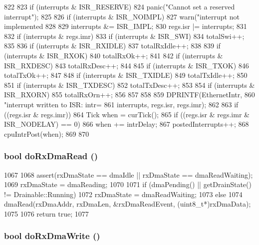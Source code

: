 \begin{DoxyCode}
822 {
823     if (interrupts & ISR_RESERVE)
824         panic("Cannot set a reserved interrupt");
825 
826     if (interrupts & ISR_NOIMPL)
827         warn("interrupt not implemented %
828 
829     interrupts &= ISR_IMPL;
830     regs.isr |= interrupts;
831 
832     if (interrupts & regs.imr) {
833         if (interrupts & ISR_SWI) {
834             totalSwi++;
835         }
836         if (interrupts & ISR_RXIDLE) {
837             totalRxIdle++;
838         }
839         if (interrupts & ISR_RXOK) {
840             totalRxOk++;
841         }
842         if (interrupts & ISR_RXDESC) {
843             totalRxDesc++;
844         }
845         if (interrupts & ISR_TXOK) {
846             totalTxOk++;
847         }
848         if (interrupts & ISR_TXIDLE) {
849             totalTxIdle++;
850         }
851         if (interrupts & ISR_TXDESC) {
852             totalTxDesc++;
853         }
854         if (interrupts & ISR_RXORN) {
855             totalRxOrn++;
856         }
857     }
858 
859     DPRINTF(EthernetIntr,
860             "interrupt written to ISR: intr=%
861             interrupts, regs.isr, regs.imr);
862 
863     if ((regs.isr & regs.imr)) {
864         Tick when = curTick();
865         if ((regs.isr & regs.imr & ISR_NODELAY) == 0)
866             when += intrDelay;
867         postedInterrupts++;
868         cpuIntrPost(when);
869     }
870 }
\end{DoxyCode}
\hypertarget{classNSGigE_a76972a99f5ea91b5b7e553f4dc521bc0}{
\subsubsection[{doRxDmaRead}]{\setlength{\rightskip}{0pt plus 5cm}bool doRxDmaRead ()}}
\label{classNSGigE_a76972a99f5ea91b5b7e553f4dc521bc0}



\begin{DoxyCode}
1067 {
1068     assert(rxDmaState == dmaIdle || rxDmaState == dmaReadWaiting);
1069     rxDmaState = dmaReading;
1070 
1071     if (dmaPending() || getDrainState() != Drainable::Running)
1072         rxDmaState = dmaReadWaiting;
1073     else
1074         dmaRead(rxDmaAddr, rxDmaLen, &rxDmaReadEvent, (uint8_t*)rxDmaData);
1075 
1076     return true;
1077 }
\end{DoxyCode}
\hypertarget{classNSGigE_aa974360bfc0dae7adca2aa197e83c044}{
\subsubsection[{doRxDmaWrite}]{\setlength{\rightskip}{0pt plus 5cm}bool doRxDmaWrite ()}}
\label{classNSGigE_aa974360bfc0dae7adca2aa197e83c044}




